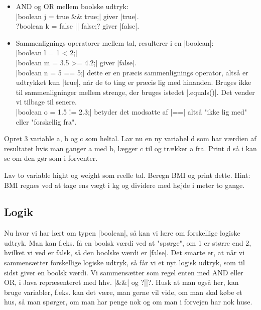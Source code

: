 {\begin{itemize}
	\item AND og OR mellem boolske udtryk:\\
	\JavaInline|boolean j = true && true;| giver \JavaInline|true|.\\
	\JavaInline?boolean k = false || false;? giver \JavaInline|false|.
	
	\item Sammenlignings operatorer mellem tal, resulterer i en \JavaInline|boolean|:\\
	\JavaInline|boolean l = 1 < 2;|\\
	\JavaInline|boolean m = 3.5 >= 4.2;| giver \JavaInline|false|.\\
	\JavaInline|boolean n = 5 == 5;| dette er en præcis sammenlignings operator, altså er udtrykket kun \JavaInline|true|, når de to ting er præcis lig med hinanden. Bruges ikke til sammenligninger mellem strenge, der bruges istedet \JavaInline|.equals()|. Det vender vi tilbage til senere.\\
	\JavaInline|boolean o = 1.5 != 2.3;| betyder det modsatte af \JavaInline|==| altså "ikke lig med" eller "forskellig fra".
\end{itemize}


\begin{exercise}
	Opret 3 variable a, b og c som heltal. Lav nu en ny variabel d som har værdien af resultatet hvis man ganger a med b, lægger c til og trækker a fra. 
	Print d så i kan se om den gør som i forventer.
\end{exercise}

\begin{exercise}
	Lav to variable hight og weight som reelle tal. Beregn BMI og print dette.
	Hint: BMI regnes ved at tage ens vægt i kg og dividere med højde i meter to gange.
\end{exercise}

\subsection{Logik}
Nu hvor vi har lært om typen \JavaInline|boolean|, så kan vi lære om forskellige logiske udtryk. Man kan f.eks. få en boolsk værdi ved at "spørge", om 1 er større end 2, hvilket vi ved er falsk, så den boolske værdi er \JavaInline|false|. Det smarte er, at når vi sammensætter forskellige logiske udtryk, så får vi et nyt logisk udtryk, som til sidst giver en boolsk værdi. Vi sammensætter som regel enten med AND eller OR, i Java repræsenteret med hhv. \JavaInline|&&| og \JavaInline?||?. Husk at man også her, kan bruge variabler, f.eks. kan det være, man gerne vil vide, om man skal købe et hus, så man spørger, om man har penge nok og om man i forvejen har nok huse. 

}
